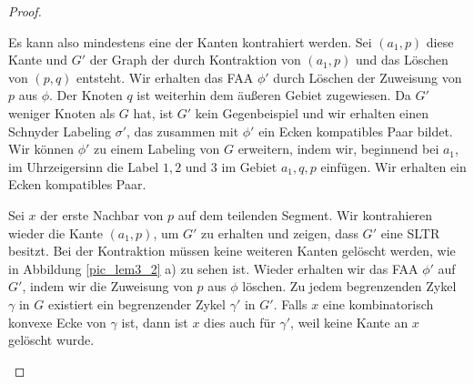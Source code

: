 \begin{proof}
\begin{description}[leftmargin =0pt, font = \rmfamily,listparindent=\parindent,parsep=0pt]
Es kann also mindestens eine der Kanten kontrahiert werden. Sei $(a_1,p)$ diese Kante und $G'$ der Graph der durch Kontraktion von $(a_1,p)$ und das Löschen von $(p,q)$ entsteht. Wir erhalten das FAA $\phi'$ durch Löschen der Zuweisung von $p$ aus $\phi$. Der Knoten $q$ ist weiterhin dem äußeren Gebiet zugewiesen. Da $G'$ weniger Knoten als $G$ hat, ist $G'$ kein Gegenbeispiel und wir erhalten einen Schnyder Labeling $\sigma'$, das zusammen mit $\phi'$ ein Ecken kompatibles Paar bildet. Wir können $\phi'$ zu einem Labeling von $G$ erweitern, indem wir, beginnend bei $a_1$, im Uhrzeigersinn die Label $1,2$ und $3$ im Gebiet $a_1,q,p$ einfügen. Wir erhalten ein Ecken kompatibles Paar.

\item[Fall 2:] Sei $x$ der erste Nachbar von $p$ auf dem teilenden Segment. Wir kontrahieren wieder die Kante $(a_1,p)$, um $G'$ zu erhalten und zeigen, dass $G'$ eine SLTR besitzt. Bei der Kontraktion müssen keine weiteren Kanten gelöscht werden, wie in Abbildung \ref{pic_lem3_2} a) zu sehen ist. Wieder erhalten wir das FAA $\phi'$ auf $G'$, indem wir die Zuweisung von $p$ aus $\phi$ löschen. Zu jedem begrenzenden Zykel $\gamma$ in $G$ existiert ein begrenzender Zykel $\gamma'$ in $G'$. Falls $x$ eine kombinatorisch konvexe Ecke von $\gamma$ ist, dann ist $x$ dies auch für $\gamma'$, weil keine Kante an $x$ gelöscht wurde.


\end{description}
\end{proof}
